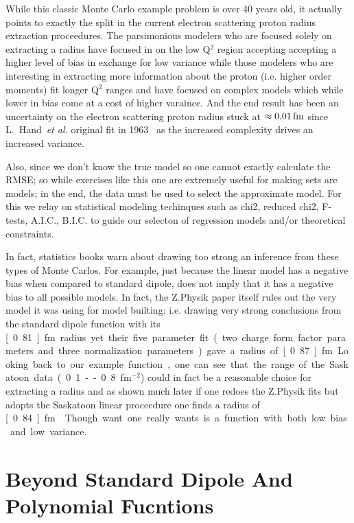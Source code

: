 \documentclass[10pt,aps,prc,twocolumn]{revtex4-1}
\begin{document}
While this classic Monte Carlo example problem is over 40 years old, it actually points to exactly the split in the current electron
scattering proton radius extraction proceedures.     The parsimonious modelers who are focused solely on extracting a radius have
focused in on the low Q$^2$ region accepting accepting a higher level of bias in exchange for low variance while those modelers
who are interesting in extracting more information about the proton (i.e. higher order moments) fit longer Q$^2$ ranges and have
focused on complex models which while lower in bias come at a cost of higher varaince.  
And the end result has been an uncertainty on the electron scattering proton radius stuck at $\approx \unit[0.01]{fm}$ since 
L.~Hand~\textit{et al.} original fit in 1963~\cite{} as the increased complexity drives an increased variance.

Also, since we don't know the true model so one cannot exactly calculate the RMSE; so while exercises like this one are
extremely useful for making sets are models; in the end, the data must be used to select the approximate model. 
For this we relay on statistical modeling techinques such as chi2, reduced chi2, F-tests, A.I.C., B.I.C. to guide our selecton of
regression models and/or theoretical constraints.

In fact, statistics books warn about drawing too strong an inference from these types of Monte Carlos.   For example,
just because the linear model has a negative bias when compared to standard dipole, does not imply that it has a negative bias
to all possible models.
In fact, the Z.Physik paper itself rules out the very model it was using for model builting: i.e. drawing very strong conclusions from the standard dipole
function with its \unit[0.81]{fm} radius yet their five parameter fit (two charge form factor parameters and three normalization parameters)
gave a radius of \unit[0.87]{fm}.

Looking back to our example function, one can see that the range of the Saskatoon data (0.1 -- 0.8 fm$^{-2}$) could in fact be a reasonable
choice for extracting a radius and as shown much later if one redoes the Z.Physik fits but adopts the Saskatoon linear proceedure one finds
a radius of \unit[0.84]{fm}~\cite{Higinbotham:2015rja}.   Though want one really wants is a function with both low bias and low variance.

\section{Beyond Standard Dipole And Polynomial Fucntions}
\end{document}
